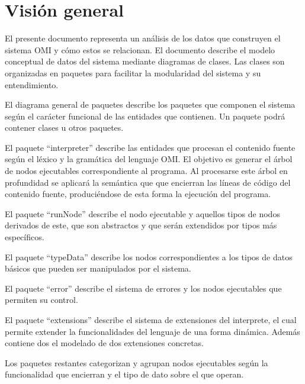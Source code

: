 \section{Visión general}
El presente documento representa un análisis de los datos que construyen
el sistema OMI y cómo estos se relacionan. El documento describe el 
modelo conceptual de datos del sistema mediante diagramas de clases. Las 
clases son organizadas en paquetes para facilitar la modularidad del sistema
y su entendimiento. 

El diagrama general de paquetes describe los paquetes que componen el 
sistema según el carácter funcional de las entidades que contienen. Un 
paquete podrá contener clases u otros paquetes.

El paquete ``interpreter'' describe las entidades que procesan  
el contenido fuente según el léxico y la gramática del lenguaje OMI. 
El objetivo es generar el árbol de nodos ejecutables correspondiente al
programa. Al procesarse este árbol en profundidad se aplicará la semántica que que encierran 
las líneas de código del contenido fuente, produciéndose de esta forma la ejecución del programa.

El paquete ``runNode'' describe el nodo ejecutable y aquellos tipos de nodos derivados
de este, que son abstractos y que serán extendidos por tipos más específicos.

El paquete ``typeData'' describe los nodos correspondientes a los tipos de datos básicos 
que pueden ser manipulados por el sistema. 

El paquete ``error'' describe el sistema de errores y los nodos ejecutables que permiten
su control.

El paquete ``extensions'' describe el sistema de extensiones del interprete, el cual
permite extender la funcionalidades del lenguaje de una forma dinámica. Además contiene dos
el modelado de dos extensiones concretas.  

Los paquetes restantes categorizan y agrupan nodos ejecutables según la funcionalidad 
que encierran y el tipo de dato sobre el que operan. 

